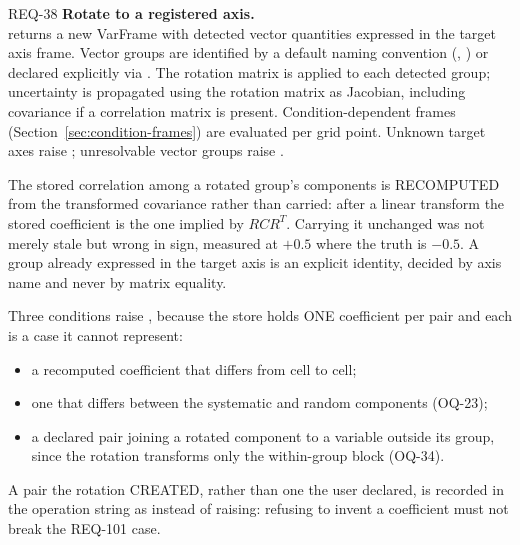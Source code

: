 \begin{reqbox}{REQ-38}{\stable}
\textbf{Rotate to a registered axis.}\\
 returns
a new VarFrame with detected vector quantities expressed in the target
axis frame. Vector groups are identified by a default naming convention
(, ) or declared explicitly via
. The rotation matrix
is applied to each detected group; uncertainty is propagated using the
rotation matrix as Jacobian, including covariance if a correlation matrix
is present. Condition-dependent frames
(Section~\ref{sec:condition-frames}) are evaluated per grid point.
Unknown target axes raise ;
unresolvable vector groups raise .

The stored correlation among a rotated group's components is
RECOMPUTED from the transformed covariance rather than carried: after a
linear transform the stored coefficient is the one implied by $RCR^T$.
Carrying it unchanged was not merely stale but wrong in sign, measured
at $+0.5$ where the truth is $-0.5$. A group already expressed in the
target axis is an explicit identity, decided by axis name and never by
matrix equality.

Three conditions raise , because the store holds
ONE coefficient per pair and each is a case it cannot represent:
\begin{itemize}[noitemsep,topsep=2pt]
  \item a recomputed coefficient that differs from cell to cell;
  \item one that differs between the systematic and random components
    (OQ-23);
  \item a declared pair joining a rotated component to a variable
    outside its group, since the rotation transforms only the
    within-group block (OQ-34).
\end{itemize}
A pair the rotation CREATED, rather than one the user declared, is
recorded in the operation string as 
instead of raising: refusing to invent a coefficient must not break the
REQ-101 case.
\end{reqbox}


